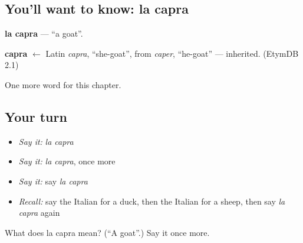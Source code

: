 \subsection*{You'll want to know: la capra}
\textbf{la capra} — \textquotedblleft{}a goat\textquotedblright{}.

\begin{cousinweb}
\textbf{capra} $\leftarrow$ Latin \emph{capra}, \textquotedblleft{}she-goat\textquotedblright{}, from \emph{caper}, \textquotedblleft{}he-goat\textquotedblright{} — inherited. (EtymDB 2.1)
\end{cousinweb}

\begin{grammarlens}[title={What you've built}]
One more word for this chapter.
\end{grammarlens}

\subsection*{Your turn}
\begin{itemize}
\raggedright
  \item \emph{Say it:} \emph{la capra}
  \item \emph{Say it:} \emph{la capra}, once more
  \item \emph{Say it:} say \emph{la capra}
  \item \emph{Recall:} say the Italian for a duck, then the Italian for a sheep, then say \emph{la capra} again
\end{itemize}

\begin{tcolorbox}[breakable,colback=teal!4,colframe=teal!35!black,title={Before you move on}]
What does la capra mean? (\textquotedblleft{}A goat\textquotedblright{}.) Say it once more.
\end{tcolorbox}
